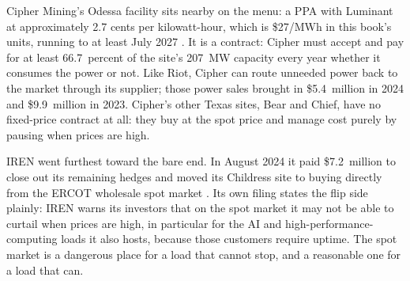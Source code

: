 Cipher Mining's Odessa facility sits nearby on the menu: a PPA with Luminant at approximately 2.7 cents per kilowatt-hour, which is \$27/MWh in this book's units, running to at least July 2027 \autocite{cipher10k2024}. %
It is a  contract: Cipher must accept and pay for at least 66.7~percent of the site's 207~MW capacity every year whether it consumes the power or not. %
Like Riot, Cipher can route unneeded power back to the market through its supplier; those power sales brought in \$5.4~million in 2024 and \$9.9~million in 2023. %
Cipher's other Texas sites, Bear and Chief, have no fixed-price contract at all: they buy at the spot price and manage cost purely by pausing when prices are high. %

IREN went furthest toward the bare end. In August 2024 it paid \$7.2~million to close out its remaining hedges and moved its Childress site to buying directly from the ERCOT wholesale spot market \autocite{iren10k2025}. %
Its own filing states the flip side plainly: IREN warns its investors that on the spot market it may not be able to curtail when prices are high, in particular for the AI and high-performance-computing loads it also hosts, because those customers require uptime. %
The spot market is a dangerous place for a load that cannot stop, and a reasonable one for a load that can.


